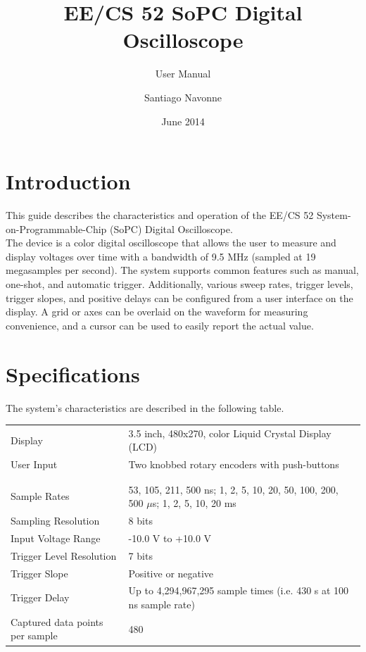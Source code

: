 \documentclass[titlepage]{scrartcl}
\begin{document}

\pagestyle{plain}

	\title{EE/CS 52 SoPC Digital Oscilloscope}
	\subtitle{User Manual}
	\author{Santiago Navonne} 
	\date{June 2014} 
	\maketitle

	
	\section{Introduction}
	This guide describes the characteristics and operation of the EE/CS 52 System-on-Programmable-Chip (SoPC) Digital Oscilloscope.\\
	
	The device is a color digital oscilloscope that allows the user to measure and display voltages over time with a bandwidth of 9.5 MHz (sampled at 19 megasamples per second). The system supports common features such as manual, one-shot, and automatic trigger. Additionally, various sweep rates, trigger levels, trigger slopes, and positive delays can be configured from a user interface on the display. A grid or axes can be overlaid on the waveform for measuring convenience, and a cursor can be used to easily report the actual value.
	
	\section{Specifications}
	The system's characteristics are described in the following table.

	\begin{center}
    		\begin{tabular}{ p{5cm} p{10cm} }
		Display & 3.5 inch, 480x270, color Liquid Crystal Display (LCD) \\
		User Input & Two knobbed rotary encoders with push-buttons \\
		\\ \hline \\
		Sample Rates & 53, 105, 211, 500 ns; 1, 2, 5, 10, 20, 50, 100, 200, 500 $\mu$s; 1, 2, 5, 10, 20 ms \\
		Sampling Resolution & 8 bits \\
		Input Voltage Range & -10.0 V to +10.0 V \\
		Trigger Level Resolution & 7 bits \\
		Trigger Slope & Positive or negative \\
		Trigger Delay & Up to 4,294,967,295 sample times (i.e. 430 s at 100 ns sample rate) \\
		Captured data points per sample & 480
		\end{tabular}
	\end{center}
		
\end{document}
